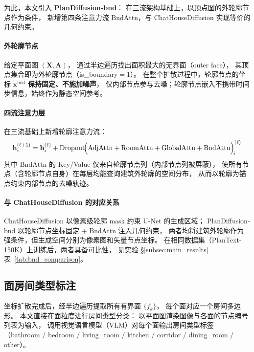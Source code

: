 为此，本文引入 \textbf{PlanDiffusion-bnd}：
在三流架构基础上，以顶点图的外轮廓节点作为条件，
新增第四条注意力流 $\mathrm{BndAttn}$，与 ChatHouseDiffusion 实现等价的几何约束。

\paragraph{外轮廓节点}
给定平面图 $(\mathbf{X}, \mathbf{A})$，
通过半边遍历找出面积最大的无界面（outer face），
其顶点集合即为外轮廓节点（is\_boundary$=1$）。
在整个扩散过程中，轮廓节点的坐标 $\mathbf{x}^{\mathrm{bnd}}$ \textbf{保持固定、不施加噪声}，
仅内部节点参与去噪；轮廓节点嵌入不携带时间步信息，始终作为静态空间参考。

\paragraph{四流注意力层}
在三流基础上新增轮廓注意力流：
\begin{equation}
    \mathbf{h}_i^{(\ell+1)} = \mathbf{h}_i^{(\ell)}
    + \mathrm{Dropout}\!\Bigl(
        \mathrm{AdjAttn}
      + \mathrm{RoomAttn}
      + \mathrm{GlobalAttn}
      + \mathrm{BndAttn}
    \Bigr)_{\!i}^{(\ell)}
    \label{eq:quad_attn}
\end{equation}
其中 $\mathrm{BndAttn}$ 的 Key/Value 仅来自轮廓节点列（内部节点列被屏蔽），
使所有节点（含轮廓节点自身）在每层均能查询建筑外轮廓的空间分布，
从而以轮廓为锚点约束内部节点的去噪轨迹。

\paragraph{与 ChatHouseDiffusion 的对应关系}
ChatHouseDiffusion 以像素级轮廓 mask 约束 U-Net 的生成区域；
PlanDiffusion-bnd 以轮廓节点坐标固定 + $\mathrm{BndAttn}$ 注入几何约束，
两者均将建筑外轮廓作为强条件，但生成空间分别为像素图和矢量节点坐标。
在相同数据集（PlanText-150K）上训练后，两者具备可比性，
见实验 §\ref{subsec:main_results} 表~\ref{tab:bnd_comparison}。

\subsection{面房间类型标注}
\label{subsec:face_type_llm}

坐标扩散完成后，经半边遍历提取所有有界面 $\{f_k\}$，
每个面对应一个房间多边形。
本文直接在面粒度进行房间类型分类：
以平面图渲染图像与各面的节点编号列表为输入，
调用视觉语言模型（VLM）对每个面输出房间类型标签
（bathroom / bedroom / living\_room / kitchen / corridor / dining\_room / other）。

